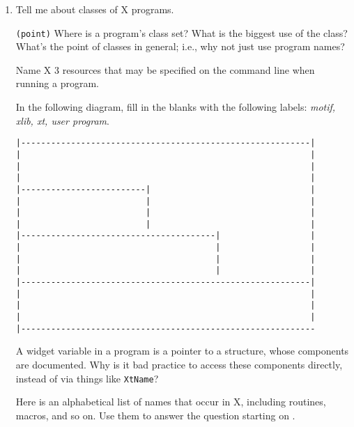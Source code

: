 \documentclass[twoside]{article}
\begin{document}
\begin{enumerate}


  {\tt (points)} Name four things that \verb+XtVaAppInitialize+ does.

\item Tell me about classes of X programs.
\begin{enumerate}
 \texttt{(point)} Where is a program's class set?
 What is the biggest use of the class?
 What's the point of classes in general; i.e., why not just
use program names?
\end{enumerate}


 Name X 3 resources that may be specified on the command line
when running a program.

 In the following diagram, fill in the blanks with the
following labels:
\emph{motif,
xlib,
xt,
user program}.

\begin{minipage}{6in}
\begin{verbatim}
|----------------------------------------------------------|
|                                                          |
|                                                          |
|                                                          |
|-------------------------|                                |
|                         |                                |
|                         |                                |
|                         |                                |
|---------------------------------------|                  |
|                                       |                  |
|                                       |                  |
|                                       |                  |
|----------------------------------------------------------|
|                                                          |
|                                                          |
|                                                          |
|-----------------------------------------------------------
\end{verbatim}
\end{minipage}


A widget variable in a program is a pointer to a structure, whose
components are documented.  Why is it bad practice to access these
components directly, instead of via things like \texttt{XtName}?

 Here is an alphabetical list of names that occur in X,
including routines, macros, and so on.   Use them to answer the
question starting on \pageref{p:q}.


\end{enumerate}
\end{document}
